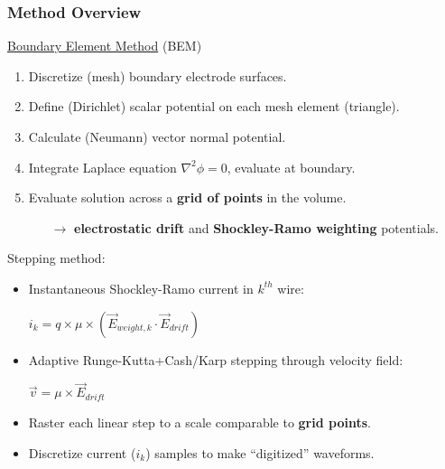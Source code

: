 \documentclass[xcolor=dvipsnames]{beamer}
\begin{document}


\begin{frame}
  \frametitle{Method Overview}
  \href{https://en.wikipedia.org/wiki/Boundary_element_method}{Boundary Element Method} (BEM)
  \begin{enumerate}\footnotesize
  \item Discretize (mesh) boundary electrode surfaces.
  \item Define (Dirichlet) scalar potential on each mesh element (triangle).
  \item Calculate (Neumann) vector normal potential.
  \item Integrate Laplace equation $\nabla^2\phi=0$, evaluate at boundary.
  \item Evaluate solution across a \textbf{grid of points} in the volume.
    \begin{itemize}\scriptsize
    \item[$\rightarrow$] \textbf{electrostatic drift} and \textbf{Shockley-Ramo weighting} potentials.
    \end{itemize}
  \end{enumerate}
  
  Stepping method:
  \begin{itemize}\footnotesize
  \item Instantaneous Shockley-Ramo current in $k^{th}$ wire: \\
    \begin{center}
      $i_k = q \times \mu \times (\vec{E}_{weight,k} \cdot \vec{E}_{drift})$      
    \end{center}
  \item Adaptive Runge-Kutta+Cash/Karp stepping through velocity field:
    \begin{center}
      $\vec{v} = \mu \times \vec{E}_{drift}$      
    \end{center}
    
  \item Raster each linear step to a scale comparable to \textbf{grid points}.
  \item Discretize current ($i_k$) samples to make ``digitized'' waveforms.
  \end{itemize}

\end{frame}
\end{document}

